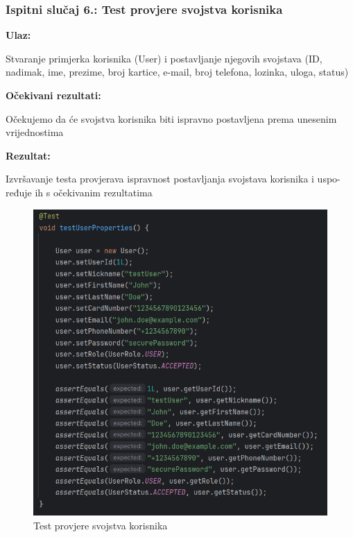                                                                       
           


            \subsubsection{Ispitni slučaj 6.: Test provjere svojstva korisnika}
            
            \noindent\textbf{Ulaz:}
            \begin{packed_item}
            	\item Stvaranje primjerka korisnika (User) i postavljanje njegovih svojstava (ID, nadimak, ime, prezime, broj kartice, e-mail, broj telefona, lozinka, uloga, status)
            \end{packed_item}
            
            \noindent\textbf{Očekivani rezultati:}
            \begin{packed_item}
            	\item Očekujemo da će svojstva korisnika biti ispravno postavljena prema unesenim vrijednostima
            \end{packed_item}
            \noindent\textbf{Rezultat:}
            \begin{packed_item}
            	\item  Izvršavanje testa provjerava ispravnost postavljanja svojstava korisnika i uspo- ređuje ih s očekivanim rezultatima
            \end{packed_item}

				\begin{figure} [H]
					\centering
					\includegraphics[width=0.7\linewidth]{slike/UserTest.png}
					\caption{Test provjere svojstva korisnika}
					\label{fig:Test provjere svojstva korisnika}
				\end{figure}

